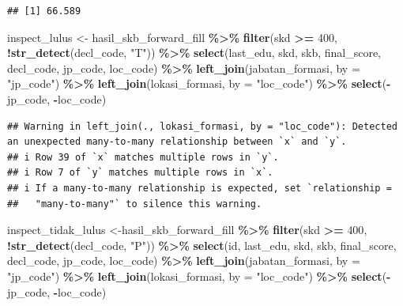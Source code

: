 \documentclass[
]{article}
\newenvironment{Shaded}{\begin{snugshade}}{\end{snugshade}}
\newcommand{\AttributeTok}[1]{\textcolor[rgb]{0.13,0.29,0.53}{#1}}
\newcommand{\DecValTok}[1]{\textcolor[rgb]{0.00,0.00,0.81}{#1}}
\newcommand{\FunctionTok}[1]{\textcolor[rgb]{0.13,0.29,0.53}{\textbf{#1}}}
\newcommand{\NormalTok}[1]{#1}
\newcommand{\OtherTok}[1]{\textcolor[rgb]{0.56,0.35,0.01}{#1}}
\newcommand{\SpecialCharTok}[1]{\textcolor[rgb]{0.81,0.36,0.00}{\textbf{#1}}}
\newcommand{\StringTok}[1]{\textcolor[rgb]{0.31,0.60,0.02}{#1}}
\begin{document}
\begin{verbatim}
## [1] 66.589
\end{verbatim}

\begin{Shaded}
\begin{Highlighting}[]
\NormalTok{inspect\_lulus }\OtherTok{\textless{}{-}}\NormalTok{ hasil\_skb\_forward\_fill }\SpecialCharTok{\%\textgreater{}\%} 
  \FunctionTok{filter}\NormalTok{(skd }\SpecialCharTok{\textgreater{}=} \DecValTok{400}\NormalTok{,}
         \SpecialCharTok{!}\FunctionTok{str\_detect}\NormalTok{(decl\_code, }\StringTok{"T"}\NormalTok{)) }\SpecialCharTok{\%\textgreater{}\%} 
  \FunctionTok{select}\NormalTok{(last\_edu, skd, skb, final\_score, decl\_code, jp\_code, loc\_code) }\SpecialCharTok{\%\textgreater{}\%} 
  \FunctionTok{left\_join}\NormalTok{(jabatan\_formasi, }\AttributeTok{by =} \StringTok{"jp\_code"}\NormalTok{) }\SpecialCharTok{\%\textgreater{}\%} 
  \FunctionTok{left\_join}\NormalTok{(lokasi\_formasi, }\AttributeTok{by =} \StringTok{"loc\_code"}\NormalTok{) }\SpecialCharTok{\%\textgreater{}\%} 
  \FunctionTok{select}\NormalTok{(}\SpecialCharTok{{-}}\NormalTok{jp\_code, }\SpecialCharTok{{-}}\NormalTok{loc\_code)}
\end{Highlighting}
\end{Shaded}

\begin{verbatim}
## Warning in left_join(., lokasi_formasi, by = "loc_code"): Detected an unexpected many-to-many relationship between `x` and `y`.
## i Row 39 of `x` matches multiple rows in `y`.
## i Row 7 of `y` matches multiple rows in `x`.
## i If a many-to-many relationship is expected, set `relationship =
##   "many-to-many"` to silence this warning.
\end{verbatim}

\begin{Shaded}
\begin{Highlighting}[]
\NormalTok{inspect\_tidak\_lulus }\OtherTok{\textless{}{-}}\NormalTok{hasil\_skb\_forward\_fill }\SpecialCharTok{\%\textgreater{}\%} 
  \FunctionTok{filter}\NormalTok{(skd }\SpecialCharTok{\textgreater{}=} \DecValTok{400}\NormalTok{,}
         \SpecialCharTok{!}\FunctionTok{str\_detect}\NormalTok{(decl\_code, }\StringTok{"P"}\NormalTok{)) }\SpecialCharTok{\%\textgreater{}\%} 
  \FunctionTok{select}\NormalTok{(id, last\_edu, skd, skb, final\_score, decl\_code, jp\_code, loc\_code) }\SpecialCharTok{\%\textgreater{}\%} 
  \FunctionTok{left\_join}\NormalTok{(jabatan\_formasi, }\AttributeTok{by =} \StringTok{"jp\_code"}\NormalTok{) }\SpecialCharTok{\%\textgreater{}\%} 
  \FunctionTok{left\_join}\NormalTok{(lokasi\_formasi, }\AttributeTok{by =} \StringTok{"loc\_code"}\NormalTok{) }\SpecialCharTok{\%\textgreater{}\%}
  \FunctionTok{select}\NormalTok{(}\SpecialCharTok{{-}}\NormalTok{jp\_code, }\SpecialCharTok{{-}}\NormalTok{loc\_code) }
\end{Highlighting}
\end{Shaded}
\end{document}
